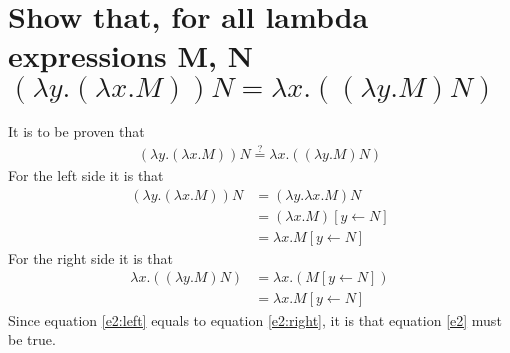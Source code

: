 \section{Show that, for all lambda expressions M, N $(\lambda y. (\lambda x. M)) N = \lambda x. ((\lambda y. M) N)$}
It is to be proven that
\begin{align}
	(\lambda y. (\lambda x. M)) N \stackrel{?}{=} \lambda x. ((\lambda y. M) N) \label{e2}
\end{align}
For the left side it is that
\begin{align}
	(\lambda y. (\lambda x. M)) N &= (\lambda y. \lambda x. M) N \\
																&= (\lambda x. M) [y \leftarrow N] \\
																&= \lambda x. M [y \leftarrow N] \label{e2:left}
\end{align}
For the right side it is that
\begin{align}
	\lambda x. ((\lambda y. M) N) &= \lambda x. (M [y \leftarrow N]) \\
																&= \lambda x. M [y \leftarrow N] \label{e2:right}
\end{align}
Since equation \ref{e2:left} equals to equation \ref{e2:right}, it is that equation \ref{e2} must be true.